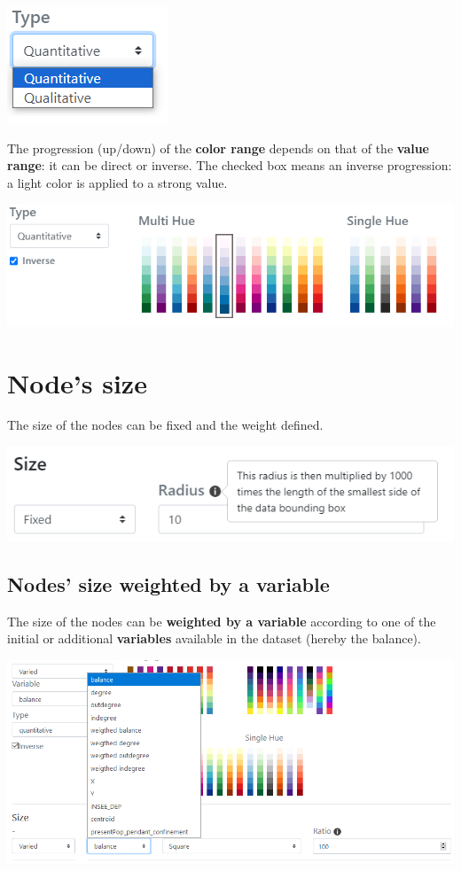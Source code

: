 \documentclass[
  letterpaper,
  DIV=11,
  numbers=noendperiod]{scrreprt}
\begin{document}
\includegraphics{images/geom_add_nodes_1_color_variable2.png}

The progression (up/down) of the \textbf{color range} depends on that of
the \textbf{value range}: it can be direct or inverse. The checked box
means an inverse progression: a light color is applied to a strong
value.

\includegraphics{images/geom_add_nodes_1_color_variable3.png}

\section{\texorpdfstring{\textbf{Node's
size}}{Node's size}}\label{nodes-size}

The size of the nodes can be fixed and the weight defined.

\includegraphics{images/geom_add_nodes_2_size.png}

\subsection{Nodes' size weighted by a
variable}\label{nodes-size-weighted-by-a-variable}

The size of the nodes can be \textbf{weighted by a variable} according
to one of the initial or additional \textbf{variables} available in the
dataset (hereby the balance).

\includegraphics{images/geom_add_nodes_2_size_variable.png}
\end{document}
